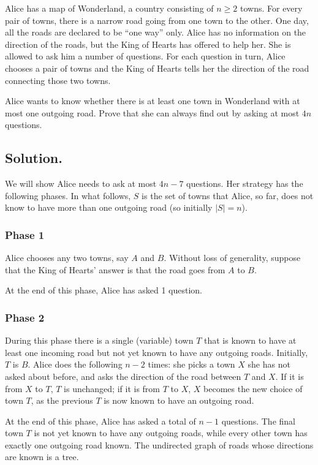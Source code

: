 \begin{problem}
Alice has a map of Wonderland, a country consisting of $n \ge 2$ towns. For every pair of towns, there is a narrow road going from one town to the other. One day, all the roads are declared to be “one way” only. Alice has no information on the direction of the roads, but the King of Hearts has offered to help her. She is allowed to ask him a number of questions. For each question in turn, Alice chooses a pair of towns and the King of Hearts tells her the direction of the road connecting those two towns.

Alice wants to know whether there is at least one town in Wonderland with at most one outgoing road. Prove that she can always find out by asking at most $4n$ questions.
\end{problem}

\subsection*{Solution.}

We will show Alice needs to ask at most $4n - 7$ questions. Her strategy has the following phases. In what follows, $S$ is the set of towns that Alice, so far, does not know to have more than one outgoing road (so initially $|S| = n$).

\subsubsection*{Phase 1}
Alice chooses any two towns, say $A$ and $B$. Without loss of generality, suppose that the King of Hearts’ answer is that the road goes from $A$ to $B$.

At the end of this phase, Alice has asked 1 question.

\subsubsection*{Phase 2}
During this phase there is a single (variable) town $T$ that is known to have at least one incoming road but not yet known to have any outgoing roads. Initially, $T$ is $B$. Alice does the following $n - 2$ times: she picks a town $X$ she has not asked about before, and asks the direction of the road between $T$ and $X$. If it is from $X$ to $T$, $T$ is unchanged; if it is from $T$ to $X$, $X$ becomes the new choice of town $T$, as the previous $T$ is now known to have an outgoing road.

At the end of this phase, Alice has asked a total of $n - 1$ questions. The final town $T$ is not yet known to have any outgoing roads, while every other town has exactly one outgoing road known. The undirected graph of roads whose directions are known is a tree.

